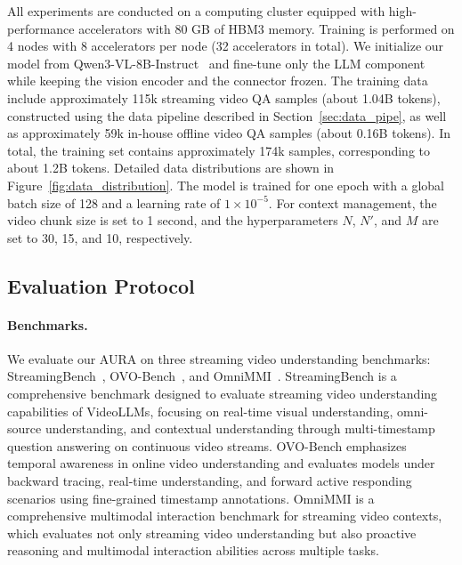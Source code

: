 \begin{table}[t]
{\begin{tabular}{l|l*{21}{c}}
    \bottomrule
  \end{tabular}%
  }
\end{table}


All experiments are conducted on a computing cluster equipped with high-performance accelerators with 80 GB of HBM3 memory. Training is performed on 4 nodes with 8 accelerators per node (32 accelerators in total). We initialize our model from Qwen3-VL-8B-Instruct~\citep{bai2025qwen3} and fine-tune only the LLM component while keeping the vision encoder and the connector frozen. The training data include approximately 115k streaming video QA samples (about 1.04B tokens), constructed using the data pipeline described in Section~\ref{sec:data_pipe}, as well as approximately 59k in-house offline video QA samples (about 0.16B tokens). In total, the training set contains approximately 174k samples, corresponding to about 1.2B tokens. Detailed data distributions are shown in Figure~\ref{fig:data_distribution}. The model is trained for one epoch with a global batch size of 128 and a learning rate of $1\times10^{-5}$. For context management, the video chunk size is set to 1 second, and the hyperparameters $N$, $N'$, and $M$ are set to 30, 15, and 10, respectively.

\subsection{Evaluation Protocol}

\paragraph{Benchmarks.}
We evaluate our AURA on three streaming video understanding benchmarks: StreamingBench~\citep{lin2024streamingbench}, OVO-Bench~\citep{niu2025ovo}, and OmniMMI~\citep{wang2025omnimmi}. StreamingBench is a comprehensive benchmark designed to evaluate streaming video understanding capabilities of VideoLLMs, focusing on real-time visual understanding, omni-source understanding, and contextual understanding through multi-timestamp question answering on continuous video streams. OVO-Bench emphasizes temporal awareness in online video understanding and evaluates models under backward tracing, real-time understanding, and forward active responding scenarios using fine-grained timestamp annotations. OmniMMI is a comprehensive multimodal interaction benchmark for streaming video contexts, which evaluates not only streaming video understanding but also proactive reasoning and multimodal interaction abilities across multiple tasks.

